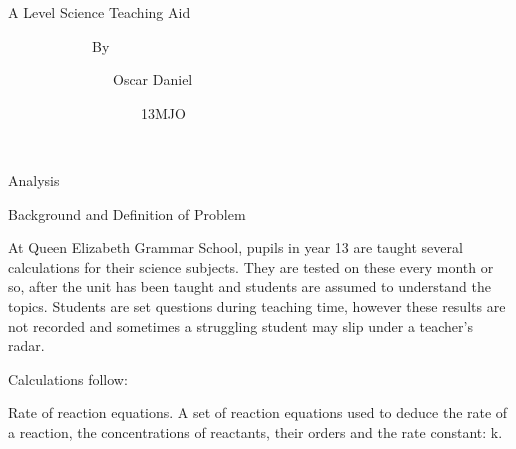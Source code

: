 \documentclass{article}
\title{}
\begin{document}
\clearpage\clearpage\setcounter{page}{1}
\bigskip

A Level Science Teaching Aid

\ \ \ \ \ \ \ \ \ \ \ \ By

\ \ \ \ \ \ \ \ \ \  \ \ \ \ \ Oscar Daniel

\ \ \ \ \ \ \ \ \ \  \ \ \ \ \ \ \ \ \ 13MJO

~


\bigskip


\bigskip


\bigskip


\bigskip


\bigskip


\bigskip


\bigskip


\bigskip


\bigskip


\bigskip


\bigskip


\bigskip


\bigskip


\bigskip


\bigskip


\bigskip


\bigskip


\bigskip


\bigskip


\bigskip


\bigskip


\bigskip


\bigskip


\bigskip


\bigskip


\bigskip

Analysis

Background and Definition of Problem


\bigskip

At Queen Elizabeth Grammar School, pupils in year 13 are taught several calculations for their science subjects. They are tested on these every month or so, after the unit has been taught and students are assumed to understand the topics. Students are set questions during teaching time, however these results are not recorded and sometimes a struggling student may slip under a teacher's radar.

Calculations follow:

Rate of reaction equations. A set of reaction equations used to deduce the rate of a reaction, the concentrations of reactants, their orders and the rate constant: k.
\end{document}
